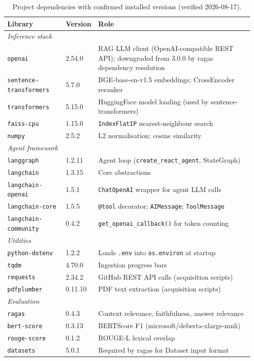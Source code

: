 \begin{table}[ht]
\centering
\small
\renewcommand{\arraystretch}{1.2}
\setlength{\tabcolsep}{4pt}
\caption{Project dependencies with confirmed installed versions (verified 2026-08-17).}
\label{tab:libraries}
\begin{tabular}{p{5.0cm}p{1.5cm}p{6.8cm}}
\hline
\textbf{Library} & \textbf{Version} & \textbf{Role} \\
\hline
\multicolumn{3}{l}{\textit{Inference stack}} \\
\texttt{openai} & 2.54.0 & RAG LLM client (OpenAI-compatible REST API); downgraded from 3.0.0 by ragas dependency resolution \\
\texttt{sentence-transformers} & 5.7.0 & BGE-base-en-v1.5 embeddings; CrossEncoder reranker \\
\texttt{transformers} & 5.15.0 & HuggingFace model loading (used by sentence-transformers) \\
\texttt{faiss-cpu} & 1.15.0 & \texttt{IndexFlatIP} nearest-neighbour search \\
\texttt{numpy} & 2.5.2 & L2 normalisation; cosine similarity \\
\hline
\multicolumn{3}{l}{\textit{Agent framework}} \\
\texttt{langgraph} & 1.2.11 & Agent loop (\texttt{create\_react\_agent}, StateGraph) \\
\texttt{langchain} & 1.3.15 & Core abstractions \\
\texttt{langchain-openai} & 1.5.1 & \texttt{ChatOpenAI} wrapper for agent LLM calls \\
\texttt{langchain-core} & 1.5.5 & \texttt{@tool} decorator; \texttt{AIMessage}; \texttt{ToolMessage} \\
\texttt{langchain-community} & 0.4.2 & \texttt{get\_openai\_callback()} for token counting \\
\hline
\multicolumn{3}{l}{\textit{Utilities}} \\
\texttt{python-dotenv} & 1.2.2 & Loads \texttt{.env} into \texttt{os.environ} at startup \\
\texttt{tqdm} & 4.70.0 & Ingestion progress bars \\
\texttt{requests} & 2.34.2 & GitHub REST API calls (acquisition scripts) \\
\texttt{pdfplumber} & 0.11.10 & PDF text extraction (acquisition scripts) \\
\hline
\multicolumn{3}{l}{\textit{Evaluation}} \\
\texttt{ragas} & 0.4.3 & Context relevance, faithfulness, answer relevance \\
\texttt{bert-score} & 0.3.13 & BERTScore F1 (microsoft/deberta-xlarge-mnli) \\
\texttt{rouge-score} & 0.1.2 & ROUGE-L lexical overlap \\
\texttt{datasets} & 5.0.1 & Required by ragas for Dataset input format \\
\hline
\end{tabular}
\end{table}

